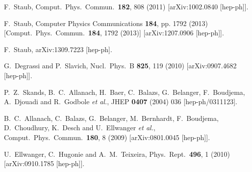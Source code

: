 \documentclass[final,3p,times,pdflatex]{elsarticle}
\begin{document}
\begin{thebibliography}{100}
  F.~Staub,
  Comput.\ Phys.\ Commun.\  {\bf 182}, 808 (2011)
  [arXiv:1002.0840 [hep-ph]].

  F.~Staub,
  Computer Physics Communications {\bf 184}, pp. 1792 (2013)
  [Comput.\ Phys.\ Commun.\  {\bf 184}, 1792 (2013)]
  [arXiv:1207.0906 [hep-ph]].

  F.~Staub,
  arXiv:1309.7223 [hep-ph].

  G.~Degrassi and P.~Slavich,
  Nucl.\ Phys.\ B {\bf 825}, 119 (2010)
  [arXiv:0907.4682 [hep-ph]].

  P.~Z.~Skands, B.~C.~Allanach, H.~Baer, C.~Balazs, G.~Belanger, F.~Boudjema, A.~Djouadi and R.~Godbole {\it et al.},
  JHEP {\bf 0407} (2004) 036
  [hep-ph/0311123].

  B.~C.~Allanach, C.~Balazs, G.~Belanger, M.~Bernhardt, F.~Boudjema, D.~Choudhury, K.~Desch and U.~Ellwanger {\it et al.},
  Comput.\ Phys.\ Commun.\  {\bf 180}, 8 (2009)
  [arXiv:0801.0045 [hep-ph]].

  U.~Ellwanger, C.~Hugonie and A.~M.~Teixeira,
  Phys.\ Rept.\  {\bf 496}, 1 (2010)
  [arXiv:0910.1785 [hep-ph]].


\end{thebibliography}
\end{document}
